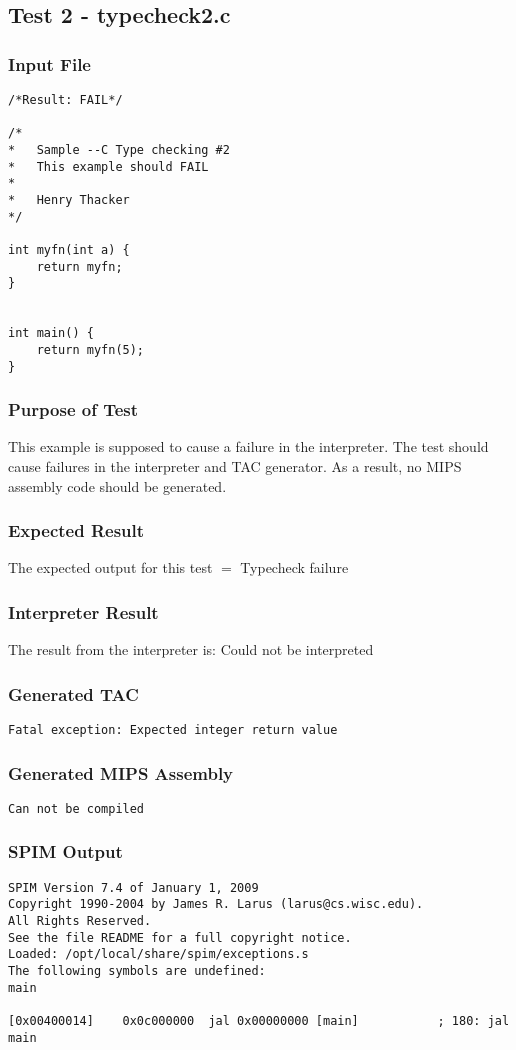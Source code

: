 \subsection{Test 2 - typecheck2.c}
\subsubsection{Input File}
\begin{lstlisting}[showstringspaces=false,breaklines=true,backgroundcolor=\color{light-gray}, captionpos=b]
/*Result: FAIL*/

/*
*	Sample --C Type checking #2
*	This example should FAIL
*
*	Henry Thacker
*/

int myfn(int a) {
	return myfn;
}


int main() {
	return myfn(5);
}
\end{lstlisting}\subsubsection{Purpose of Test}
This example is supposed to cause a failure in the interpreter. The test should cause failures in the interpreter and TAC generator. As a result, no MIPS assembly code should be generated.
\subsubsection{Expected Result}
The expected output for this test $=$ Typecheck failure
\subsubsection{Interpreter Result}
The result from the interpreter is: Could not be interpreted
\subsubsection{Generated TAC}
\begin{lstlisting}[showstringspaces=false,breaklines=true,backgroundcolor=\color{light-gray}, captionpos=b]
Fatal exception: Expected integer return value

\end{lstlisting}\subsubsection{Generated MIPS Assembly}
\begin{lstlisting}[showstringspaces=false,breaklines=true,backgroundcolor=\color{light-gray}, captionpos=b]
Can not be compiled
\end{lstlisting}\subsubsection{SPIM Output}
\begin{verbatim}
SPIM Version 7.4 of January 1, 2009
Copyright 1990-2004 by James R. Larus (larus@cs.wisc.edu).
All Rights Reserved.
See the file README for a full copyright notice.
Loaded: /opt/local/share/spim/exceptions.s
The following symbols are undefined:
main

[0x00400014]	0x0c000000  jal 0x00000000 [main]           ; 180: jal main
\end{verbatim}
